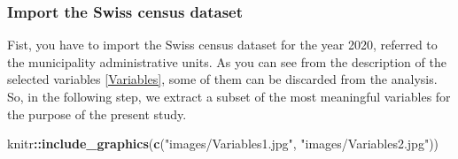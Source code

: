 \documentclass[
]{article}
\newenvironment{Shaded}{\begin{snugshade}}{\end{snugshade}}
\newcommand{\FunctionTok}[1]{\textcolor[rgb]{0.13,0.29,0.53}{\textbf{#1}}}
\newcommand{\NormalTok}[1]{#1}
\newcommand{\SpecialCharTok}[1]{\textcolor[rgb]{0.81,0.36,0.00}{\textbf{#1}}}
\newcommand{\StringTok}[1]{\textcolor[rgb]{0.31,0.60,0.02}{#1}}
\begin{document}
\subsubsection{Import the Swiss census dataset}\label{import-the-swiss-census-dataset}

Fist, you have to import the Swiss census dataset for the year 2020, referred to the municipality administrative units.
As you can see from the description of the selected variables \autoref{Variables}, some of them can be discarded from the analysis.
So, in the following step, we extract a subset of the most meaningful variables for the purpose of the present study.

\begin{Shaded}
\begin{Highlighting}[]
\NormalTok{knitr}\SpecialCharTok{::}\FunctionTok{include\_graphics}\NormalTok{(}\FunctionTok{c}\NormalTok{(}\StringTok{"images/Variables1.jpg"}\NormalTok{, }\StringTok{"images/Variables2.jpg"}\NormalTok{))}
\end{Highlighting}
\end{Shaded}
\end{document}
